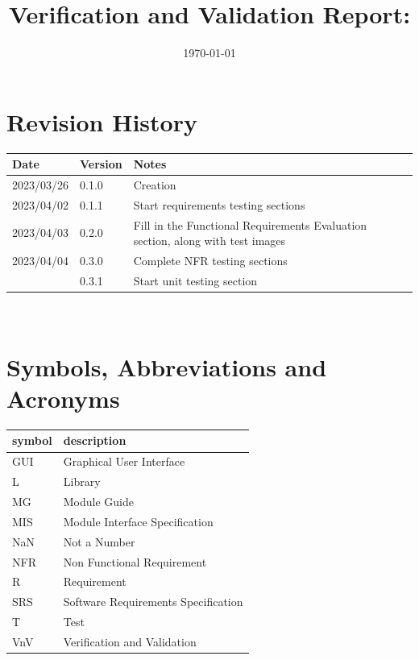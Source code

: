 \documentclass[12pt, titlepage]{article}
\begin{document}
\title{Verification and Validation Report: \progname} 
\author{\authname}
\date{\today}
	
\maketitle


\section{Revision History}

\begin{tabularx}{\textwidth}{p{3cm}p{2cm}X}
\toprule {\bf Date} & {\bf Version} & {\bf Notes}\\
\midrule
2023/03/26 & 0.1.0 & Creation\\
2023/04/02 & 0.1.1 & Start requirements testing sections\\
2023/04/03 & 0.2.0 & Fill in the Functional Requirements Evaluation
  section, along with test images\\
2023/04/04 & 0.3.0 & Complete NFR testing sections\\
           & 0.3.1 & Start unit testing section\\
\bottomrule
\end{tabularx}

~\newpage

\section{Symbols, Abbreviations and Acronyms}

\renewcommand{\arraystretch}{1.2}
\begin{tabular}{l l} 
  \toprule		
  \textbf{symbol} & \textbf{description}\\
  \midrule 
  GUI & Graphical User Interface\\
  L & Library\\
  MG & Module Guide\\
  MIS & Module Interface Specification\\
  NaN & Not a Number\\
  NFR & Non Functional Requirement\\
  R & Requirement\\
  SRS & Software Requirements Specification\\
  T & Test\\
  VnV & Verification and Validation\\
  \bottomrule
\end{tabular}\\
\end{document}
